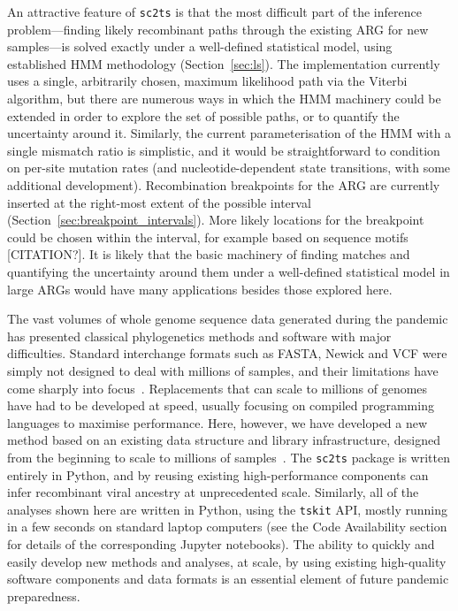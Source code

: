 \documentclass{article}
\begin{document}
An attractive feature of \texttt{sc2ts} is that the most difficult part of
the inference problem---finding likely recombinant paths through the existing ARG
for new samples---is solved exactly under a well-defined statistical model,
using established HMM methodology (Section~\ref{sec:ls}).
The implementation currently uses
a single, arbitrarily chosen, maximum likelihood path via the
Viterbi algorithm, but there are numerous ways in which the HMM machinery
could be extended in order to explore the set of possible paths, or to
quantify the uncertainty around it. Similarly, the current parameterisation
of the HMM with a single mismatch ratio is simplistic, and it would
be straightforward to condition on per-site mutation rates (and nucleotide-dependent
state transitions, with some additional development).
Recombination breakpoints for the ARG are currently inserted at the
right-most extent of the possible interval
(Section~\ref{sec:breakpoint_intervals}). More likely locations for the
breakpoint could be chosen within the interval, for example based
on sequence motifs [CITATION?].
It is likely that the basic machinery of finding matches and quantifying
the uncertainty around them under a well-defined statistical model
in large ARGs would have many applications besides those explored here.

The vast volumes of whole genome sequence data generated during the pandemic
has presented classical phylogenetics methods and software with major difficulties.
Standard interchange formats such as FASTA, Newick and VCF were simply not designed
to deal with millions of samples, and their limitations have come sharply
into focus~\citep{Turakhia2021-ur,de2023maximum}.
Replacements that can scale to millions of genomes have had to be developed
at speed, usually focusing on compiled programming languages to maximise
performance. Here, however, we have developed a new method based on
an existing data structure and library infrastructure, designed
from the beginning to scale to millions of
samples~\citep{Kelleher2016-wk,Kelleher2019-ba}.
The \texttt{sc2ts} package is written entirely in Python,
and by reusing existing high-performance components can infer
recombinant viral ancestry at unprecedented scale.
Similarly, all of the analyses shown here are written in Python,
using the \texttt{tskit} API, mostly running in a few seconds
on standard laptop computers (see the Code Availability
section for details of the corresponding Jupyter notebooks).
The ability to quickly and easily develop new methods and
analyses, at scale, by using existing high-quality software
components and data formats is an essential element of future
pandemic preparedness.
\end{document}
